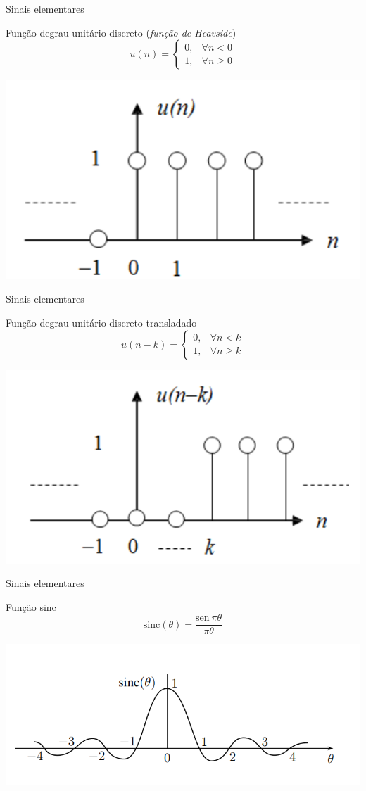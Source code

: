 \begin{frame}{Sinais elementares}
\begin{block}{Função degrau unitário discreto (\textit{função de Heavside})}
\begin{equation*}
u(n) = \begin{cases}
0, & \forall n < 0 \\
1, & \forall n \geq 0
\end{cases}
\end{equation*}
\end{block}
\centerline{\includegraphics[width=0.5\linewidth]{Figuras/Ch01/fig6.PNG}}
\end{frame}

\begin{frame}{Sinais elementares}
\begin{block}{Função degrau unitário discreto transladado}
\begin{equation*}
u(n - k) = \begin{cases}
0, & \forall n < k \\
1, & \forall n \geq k
\end{cases}
\end{equation*}
\end{block}
\centerline{\includegraphics[width=0.5\linewidth]{Figuras/Ch01/fig7.PNG}}
\end{frame}

\begin{frame}{Sinais elementares}
\begin{block}{Função sinc}
\begin{equation*}
\text{sinc}(\theta) = \dfrac{\text{sen} \ \pi \theta}{\pi \theta}
\end{equation*}
\end{block}
\centerline{\includegraphics[width=0.9\linewidth]{Figuras/Ch01/fig8.PNG}}
\end{frame}

